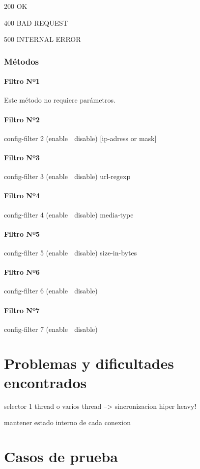 \documentclass[a4paper,10pt]{article}
\begin{document}
        200 OK

        400 BAD REQUEST

        500 INTERNAL ERROR


        \subsubsection{M\'etodos}
        
            \paragraph*{Filtro Nº1}

            Este m\'etodo no requiere par\'ametros.

            \paragraph*{Filtro Nº2}
             config-filter 2 (enable | disable) [ip-adress or mask]

            \paragraph*{Filtro Nº3}
            config-filter 3 (enable | disable) url-regexp

            \paragraph*{Filtro Nº4}
            config-filter 4 (enable | disable) media-type

            \paragraph*{Filtro Nº5}
            config-filter 5 (enable | disable) size-in-bytes

            \paragraph*{Filtro Nº6}
            config-filter 6 (enable | disable)

            \paragraph*{Filtro Nº7}
            config-filter 7 (enable | disable)
\newpage
\section{Problemas y dificultades encontrados}

selector 1 thread  o varios thread --> sincronizacion hiper heavy!

mantener estado interno de cada conexion

\newpage
\section{Casos de prueba}
\end{document}
